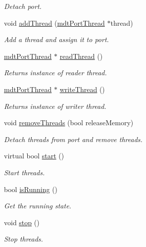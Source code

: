 \begin{DoxyCompactItemize}
\begin{DoxyCompactList}\small\item\em Detach port. \end{DoxyCompactList}\item 
void \hyperlink{classmdt_port_manager_ab62591409d019a4a2576b4310c411b8f}{addThread} (\hyperlink{classmdt_port_thread}{mdtPortThread} $\ast$thread)
\begin{DoxyCompactList}\small\item\em Add a thread and assign it to port. \end{DoxyCompactList}\item 
\hyperlink{classmdt_port_thread}{mdtPortThread} $\ast$ \hyperlink{classmdt_port_manager_ad9233b5156a45f2684783317d75fdf9b}{readThread} ()
\begin{DoxyCompactList}\small\item\em Returns instance of reader thread. \end{DoxyCompactList}\item 
\hyperlink{classmdt_port_thread}{mdtPortThread} $\ast$ \hyperlink{classmdt_port_manager_af44b6e9876e6687b1d4fe7e05ffd5a91}{writeThread} ()
\begin{DoxyCompactList}\small\item\em Returns instance of writer thread. \end{DoxyCompactList}\item 
void \hyperlink{classmdt_port_manager_aaa0a474183bcae0fff4fb9ef43023c25}{removeThreads} (bool releaseMemory)
\begin{DoxyCompactList}\small\item\em Detach threads from port and remove threads. \end{DoxyCompactList}\item 
virtual bool \hyperlink{classmdt_port_manager_af1fb103ffafc227337a59c7e82f44fbc}{start} ()
\begin{DoxyCompactList}\small\item\em Start threads. \end{DoxyCompactList}\item 
bool \hyperlink{classmdt_port_manager_af460167e604b8b6e2e933a98b2b6b5a2}{isRunning} ()
\begin{DoxyCompactList}\small\item\em Get the running state. \end{DoxyCompactList}\item 
void \hyperlink{classmdt_port_manager_aacbf87cc3d9c37c87e21696f8a6514bd}{stop} ()
\begin{DoxyCompactList}\small\item\em Stop threads. \end{DoxyCompactList}\item 

\end{DoxyCompactItemize}
